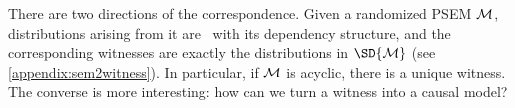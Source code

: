 There are two directions of the correspondence. 
Given a randomized PSEM $\cal M$, distributions arising from it are
\cible\
with its dependency structure, and the corresponding
witnesses are exactly 
the distributions in $\SD{\mathcal M}$ (see \cref{appendix:sem2witness}).
In particular, if $\cal M$ is
acyclic, there is a unique witness.  
The converse is more interesting: how can we turn a witness into a causal model?


